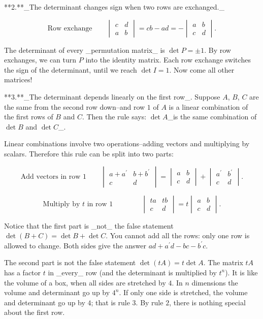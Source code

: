 

**2.**_The determinant changes sign when two rows are exchanged._

\[\mbox{Row exchange}\qquad\begin{vmatrix}c&d\\ a&b\end{vmatrix}=cb-ad=-\begin{vmatrix}a&b\\ c&d\end{vmatrix}.\]

The determinant of every _permutation matrix_ is \(\det P=\pm 1\). By row exchanges, we can turn \(P\) into the identity matrix. Each row exchange switches the sign of the determinant, until we reach \(\det I=1\). Now come all other matrices!

**3.**_The determinant depends linearly on the first row_. Suppose \(A\), \(B\), \(C\) are the same from the second row down--and row \(1\) of \(A\) is a linear combination of the first rows of \(B\) and \(C\). Then the rule says: \(\det A\)_is the same combination of \(\det B\) and \(\det C\)_.

Linear combinations involve two operations--adding vectors and multiplying by scalars. Therefore this rule can be split into two parts:

\[\mbox{Add vectors in row 1}\qquad\begin{vmatrix}a+a^{\prime}&b+b^{\prime}\\ c&d\end{vmatrix}=\begin{vmatrix}a&b\\ c&d\end{vmatrix}+\begin{vmatrix}a^{\prime}&b^{\prime}\\ c&d\end{vmatrix}.\]

\[\mbox{Multiply by $t$ in row 1}\qquad\qquad\begin{vmatrix}ta&tb\\ c&d\end{vmatrix}=t\begin{vmatrix}a&b\\ c&d\end{vmatrix}.\]

Notice that the first part is _not_ the false statement \(\det(B+C)=\det B+\det C\). You cannot add all the rows: only one row is allowed to change. Both sides give the answer \(ad+a^{\prime}d-bc-b^{\prime}c\).

The second part is not the false statement \(\det(tA)=t\det A\). The matrix \(tA\) has a factor \(t\) in _every_ row (and the determinant is multiplied by \(t^{n}\)). It is like the volume of a box, when all sides are stretched by \(4\). In \(n\) dimensions the volume and determinant go up by \(4^{n}\). If only one side is stretched, the volume and determinant go up by \(4\); that is rule \(3\). By rule \(2\), there is nothing special about the first row.

